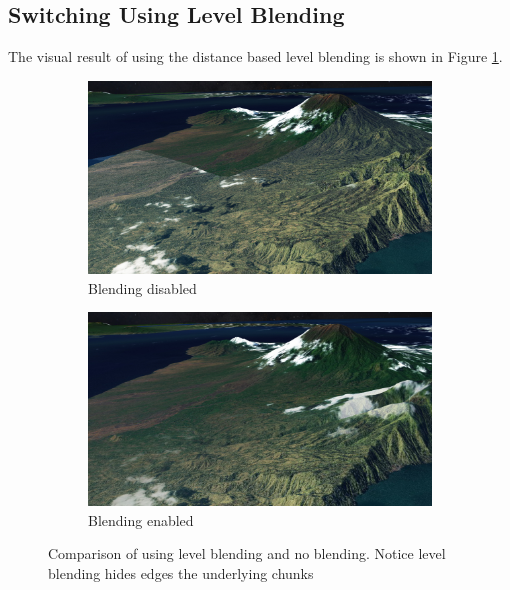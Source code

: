 \subsection{Switching Using Level Blending}
\label{section:res_switching}
\FloatBarrier
The visual result of using the distance based level blending is shown in Figure \ref{fig:blending2}.
\begin{figure}[h]
    \centering
    \begin{subfigure}[bt]{0.48\textwidth}
        \includegraphics[width=\textwidth]{figures/results/blending/blending_bali2_disabled.jpg}
        \caption{Blending disabled}
    \end{subfigure}
    \begin{subfigure}[bt]{0.48\textwidth}
        \includegraphics[width=\textwidth]{figures/results/blending/blending_bali2_enabled.jpg}
        \caption{Blending enabled}
    \end{subfigure}
    \caption{Comparison of using level blending and no blending. Notice level blending hides edges the underlying chunks}
    \label{fig:blending2}
\end{figure}

